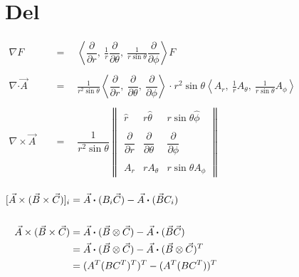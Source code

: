 \documentclass[12pt]{article}
\newcommand*{\dotP}{\boldsymbol \cdot}		%
\begin{document}
\section{Del}
\vspace{5pt}
\(\begin{aligned}
	\nabla F \quad &= \quad \left \langle \dfrac{\partial}{\partial r} , 
		\ \frac{1}{r} \dfrac{\partial}{\partial \theta} , 
		\ \frac{1}{ r \sin{\theta} } \dfrac{\partial}{\partial \phi} \right \rangle F \\
	\\
	\nabla \dotP \vec{A} \quad &= \quad \frac{1}{r^2 \sin{\theta}} \left\langle \dfrac{\partial}{\partial r} , 
		\ \dfrac{\partial}{\partial \theta} , \ \dfrac{\partial}{\partial \phi} \right\rangle 
		\ \dotP \ r^2 \sin{\theta} 
		\left\langle A_r , \ \frac{1}{r} A_\theta , \ \frac{1}{ r \sin{\theta} } A_\phi \right\rangle \\
	\\
	\nabla \times \vec{A} \quad &= \quad \dfrac{1}{ r^2 \sin{\theta} } 
		\begin{Vmatrix}
			\hat{r} 					 & r \hat{\theta} 			    & r \sin{\theta} \hat{\phi}\\ \\
			\dfrac{\partial}{\partial r} & \dfrac{\partial}{\partial \theta} & \dfrac{\partial}{\partial \phi}\\ \\
			A_r							 & r A_\theta				    & r \sin{\theta} A_\phi
		\end{Vmatrix} \\
\end{aligned}\)

\vspace{20pt}
\(\begin{aligned}
	\relax[ \vec{A} \times (\vec{B} \times \vec{C}) ]_i 
		&= \vec{A} \dotP ( B_i \vec{C} ) - \vec{A} \dotP ( \vec{B} C_i ) \\ \\
	\vec{A} \times (\vec{B} \times \vec{C}) 
	&= \vec{A} \dotP ( \vec{B} \otimes \vec{C} ) - \vec{A} \dotP ( \vec{B} \vec{C} )\\
	&= \vec{A} \dotP ( \vec{B} \otimes \vec{C} ) - \vec{A} \dotP ( \vec{B} \otimes \vec{C} )^T\\
	&= ( A^T ( BC^T )^T )^T - ( A^T ( BC^T ) )^T
\end{aligned}\)
\end{document}
